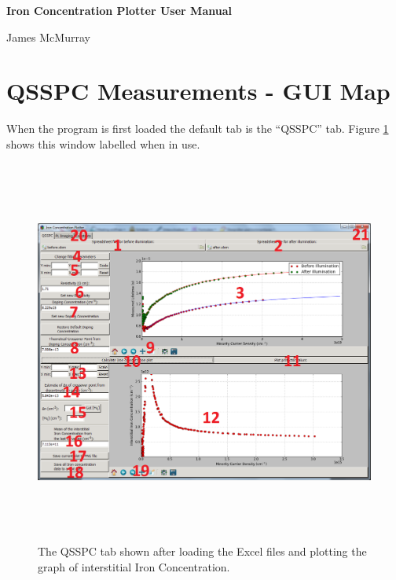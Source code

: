 \documentclass[final,a4paper,oneside,12pt]{article}
\begin{document}
\centerline{\Large \bf{Iron Concentration Plotter User Manual}}
\bigskip
\centerline{James McMurray}
\bigskip

\renewcommand{\labelenumi}{{\color{red} {\bf\arabic{enumi}}}}

\section{QSSPC Measurements - GUI Map}

When the program is first loaded the default tab is the ``QSSPC'' tab. Figure \ref{figure1} shows this window labelled when in use.

\begin{figure}[h]
\includegraphics[height=5in]{2mainscreen}
\caption{\label{figure1} The QSSPC tab shown after loading the Excel files and plotting the graph of interstitial Iron Concentration.}
\end{figure}
\end{document}
